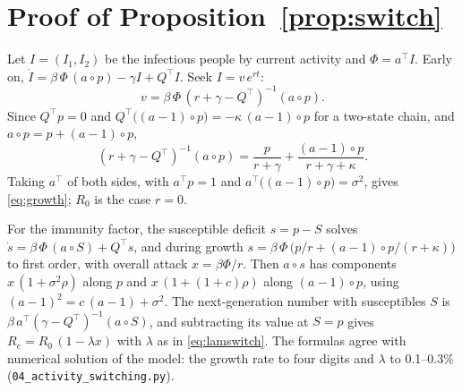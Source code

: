 \documentclass[11pt]{article}
\theoremstyle{remark}
\begin{document}
\appendix
\section{Proof of Proposition~\ref{prop:switch}}\label{app:proof}

Let $I = (I_1, I_2)$ be the infectious people by current activity and $\Phi = a^\top I$. Early on, $\dot I = \beta\,\Phi\,(a
\circ p) - \gamma I + Q^\top I$. Seek $I = v\,e^{rt}$:
\begin{equation}
  v = \beta\,\Phi\,(r + \gamma - Q^\top)^{-1}(a\circ p).
\end{equation}
Since $Q^\top p = 0$ and $Q^\top\big((a - 1)\circ p\big) = -\kappa\,(a - 1)\circ p$ for a two-state chain, and $a\circ p = p +
(a - 1)\circ p$,
\begin{equation}
  (r + \gamma - Q^\top)^{-1}(a\circ p) = \frac{p}{r + \gamma} + \frac{(a - 1)\circ p}{r + \gamma + \kappa}.
\end{equation}
Taking $a^\top$ of both sides, with $a^\top p = 1$ and $a^\top\big((a - 1)\circ p\big) = \sigma^2$, gives \eqref{eq:growth}; $R_0$
is the case $r = 0$.

For the immunity factor, the susceptible deficit $s = p - S$ solves $\dot s = \beta\,\Phi\,(a \circ S) + Q^\top s$, and
during growth $s = \beta\,\Phi\,\big(p/r + (a - 1)\circ p/(r + \kappa)\big)$ to first order, with overall attack $x = \beta\Phi/r$.
Then $a\circ s$ has components $x\,(1 + \sigma^2\rho)$ along $p$ and $x\,(1 + (1 + c)\rho)$ along $(a - 1)\circ p$, using
$(a - 1)^2 = c\,(a - 1) + \sigma^2$. The next-generation number with susceptibles $S$ is $\beta\,a^\top(\gamma - Q^\top)^{-1}(a\circ S)$,
and subtracting its value at $S = p$ gives $R_e = R_0\,(1 - \lambda x)$ with $\lambda$ as in \eqref{eq:lamswitch}.
The formulas agree with numerical solution of the model: the growth rate to four digits and $\lambda$ to 0.1--0.3\%
(\texttt{04\_activity\_switching.py}).
\end{document}
